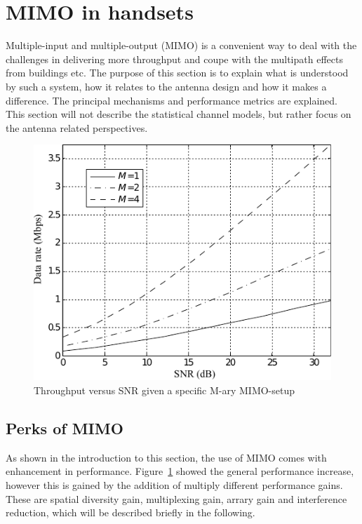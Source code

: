 \section{MIMO in handsets} %
\label{sec:mimo_in_handsets}
Multiple-input and multiple-output (MIMO) is a convenient way to deal with the challenges in delivering more throughput and coupe with the multipath effects from buildings etc. The purpose of this section is to explain what is understood by such a system, how it relates to the antenna design and how it makes a difference. The principal mechanisms and performance metrics are explained. This section will not describe the statistical channel models, but rather focus on the antenna related perspectives. 

\begin{figure}[htbp]
  \centering
  \includegraphics[scale=1.2]{img/analysis/datarateMimo}
  \caption{Throughput versus SNR given a specific M-ary MIMO-setup\cite{Ezio2007MIMO}}
  \label{fig:mimo-throughput}
\end{figure}

\subsection{Perks of MIMO} 
As shown in the introduction to this section, the use of MIMO comes with enhancement in performance. Figure~\ref{fig:mimo-throughput} showed the general performance increase, however this is gained by the addition of multiply different performance gains. These are spatial diversity gain, multiplexing gain, arrary gain and interference reduction\cite{Ezio2007MIMO}, which will be described briefly in the following.


